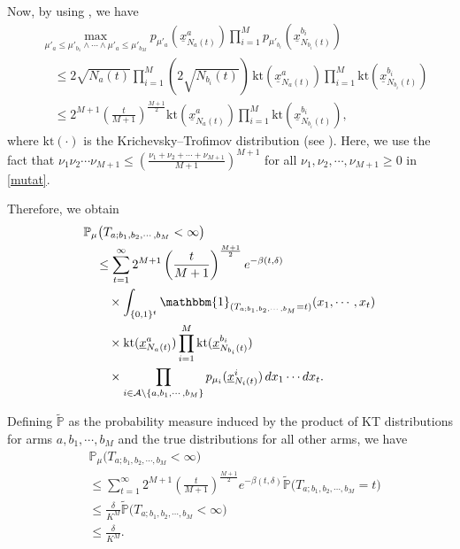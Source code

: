 \documentclass[final]{IEEEtran}
\newcommand{\nn}{\nonumber}
\begin{document}
Now, by using \cite[Lemma 11]{garivier2016optimal}, we have
\begin{align}
&\max_{\mu'_a \leq \mu'_{b_1} \wedge \cdots \wedge \mu'_a \leq \mu'_{b_M}} p_{\mu'_a}(\underline{x}_{N_a(t)}^a) \prod_{i=1}^M p_{\mu'_{b_i}}(\underline{x}_{N_{b_i}(t)}^{b_i}) \nonumber \\
&\quad \leq 2 \sqrt{N_a(t)} \prod_{i=1}^M (2 \sqrt{N_{b_i}(t)}) \, \text{kt}(\underline{x}_{N_a(t)}^a) \prod_{i=1}^M \text{kt}(\underline{x}_{N_{b_i}(t)}^{b_i}) \nonumber \\
&\quad \leq 2^{M+1} \left(\frac{t}{M+1}\right)^{\frac{M+1}{2}} \text{kt}(\underline{x}_{N_a(t)}^a) \prod_{i=1}^M \text{kt}(\underline{x}_{N_{b_i}(t)}^{b_i}) \label{mutat},
\end{align}
where \(\text{kt}(\cdot)\) is the Krichevsky–Trofimov distribution (see \cite{Krichevsky1981}). Here, we use the fact that $\nu_1 \nu_2 \cdots \nu_{M+1} \leq (\frac{\nu_1+\nu_2+\cdots+ \nu_{M+1}}{M+1})^{M+1}$ for all $\nu_1,\nu_2, \cdots, \nu_{M+1} \geq 0$ in \eqref{mutat}. 

Therefore, we obtain
\begin{align}
&\mathbb{P}_{\mu}\big(T_{a;b_1,b_2,\cdots,b_M} < \infty\big) \nn \\
&\quad \leq \sum_{t=1}^\infty 2^{M+1} \left(\frac{t}{M+1}\right)^{\frac{M+1}{2}} e^{-\beta(t,\delta)} \nn\\
&\qquad \times \int_{\{0,1\}^t} \mathbbm{1}_{(T_{a;b_1,b_2,\cdots,b_M} = t)}(x_1,\cdots,x_t) \nonumber \\
&\qquad \times \text{kt}(\underline{x}_{N_a(t)}^a) \prod_{i=1}^M \text{kt}(\underline{x}_{N_{b_i}(t)}^{b_i}) \nn\\
&\qquad \times \prod_{i \in \mathcal{A} \setminus \{a,b_1,\cdots,b_M\}} p_{\mu_i}(\underline{x}_{N_i(t)}^i) \, dx_1 \cdots dx_t.
\end{align}

Defining \(\tilde{\mathbb{P}}\) as the probability measure induced by the product of KT distributions for arms \(a,b_1,\cdots,b_M\) and the true distributions for all other arms, we have
\begin{align}
&\mathbb{P}_{\mu}\big(T_{a;b_1,b_2,\cdots,b_M} < \infty\big)\nn\\
&\leq \sum_{t=1}^\infty 2^{M+1} \left(\frac{t}{M+1}\right)^{\frac{M+1}{2}} e^{-\beta(t,\delta)} \tilde{\mathbb{P}}\big(T_{a;b_1,b_2,\cdots,b_M} = t\big) \nonumber \\
&\leq \frac{\delta}{K^M} \tilde{\mathbb{P}}\big(T_{a;b_1,b_2,\cdots,b_M} < \infty\big)\nn\\
& \leq \frac{\delta}{K^M}.
\end{align}
\end{document}
